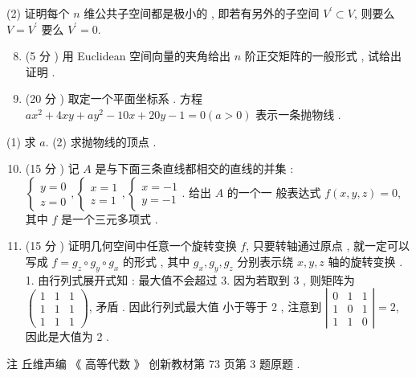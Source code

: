 \documentclass[10pt]{article}
\begin{document}
(2)  证明每个  $n$  维公共子空间都是极小的 ,  即若有另外的子空间  $V^{\prime} \subset V$,  则要么  $V=V^{\prime}$  要么  $V^{\prime}=0$.

\begin{enumerate}
  \setcounter{enumi}{7}
  \item (5  分 )  用  Euclidean  空间向量的夹角给出  $n$  阶正交矩阵的一般形式 ,  试给出证明 .

  \item (20  分 )  取定一个平面坐标系 .  方程  $a x^{2}+4 x y+a y^{2}-10 x+20 y-1=0(a>0)$  表示一条抛物线 .

\end{enumerate}
(1)  求  $a$. (2)  求抛物线的顶点 .

\begin{enumerate}
  \setcounter{enumi}{9}
  \item (15  分 )  记  $A$  是与下面三条直线都相交的直线的并集 : $\left\{\begin{array}{l}y=0 \\ z=0\end{array},\left\{\begin{array}{l}x=1 \\ z=1\end{array},\left\{\begin{array}{l}x=-1 \\ y=-1\end{array}\right.\right.\right.$.  给出  $A$  的一个一   般表达式  $f(x, y, z)=0$,  其中  $f$  是一个三元多项式 .

  \item (15  分 )  证明几何空间中任意一个旋转变换  $f$,  只要转轴通过原点 ,  就一定可以写成  $f=g_{z} \circ g_{y} \circ g_{x}$  的形式 ,  其中  $g_{x}, g_{y}, g_{z}$  分别表示绕  $x, y, z$  轴的旋转变换 . 1.  由行列式展开式知 :  最大值不会超过  3.  因为若取到  3 ,  则矩阵为  $\left(\begin{array}{ccc}1 & 1 & 1 \\ 1 & 1 & 1 \\ 1 & 1 & 1\end{array}\right)$,  矛盾 .  因此行列式最大值   小于等于  2 ,  注意到  $\left|\begin{array}{ccc}0 & 1 & 1 \\ 1 & 0 & 1 \\ 1 & 1 & 0\end{array}\right|=2$,  因此是大值为  2 .

\end{enumerate}
 注   丘维声编 《 高等代数 》 创新教材第  73  页第  3  题原题 .
\end{document}
